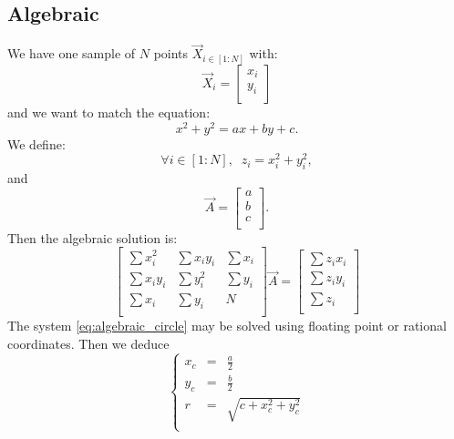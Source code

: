 \documentclass[aps,12pt]{revtex4}
\begin{document}
\subsection{Algebraic}
We have one sample of $N$ points $\vec{X}_{i\in[1:N]}$ with:
\begin{equation}
	\vec{X}_i = \begin{bmatrix}x_i\\y_i\\\end{bmatrix}
\end{equation}
and we want to match the equation:
\begin{equation}
	x^2+y^2=ax+by+c.
\end{equation}
We define:
\begin{equation}
	\forall i \in [1:N], \;\; z_i = x_i^2+y_i^2,
\end{equation}
and
\begin{equation}
	\vec{A} = \begin{bmatrix} a\\b\\c\\ \end{bmatrix}.
\end{equation}
Then the algebraic solution is:
\begin{equation}
\label{eq:algebraic_circle}
\begin{bmatrix}
	\sum x_i^2 & \sum x_iy_i & \sum x_i\\
	\sum x_iy_i & \sum y_i^2 & \sum y_i\\
	\sum x_i & \sum y_i & N \\
	\end{bmatrix}
\vec{A} = \begin{bmatrix}
	\sum z_i x_i\\
	\sum z_i y_i\\
	\sum z_i\\
\end{bmatrix}
\end{equation}
The system \eqref{eq:algebraic_circle} may be solved using floating point or rational coordinates.
Then we deduce 
\begin{equation}
\left\lbrace
\begin{array}{rcl}
	x_c & = & \frac{a}{2}  \\
	y_c & = & \frac{b}{2} \\
	r   & = & \sqrt{c+x_c^2+y_c^2}\\
\end{array}
\right.
\end{equation}
\end{document}
